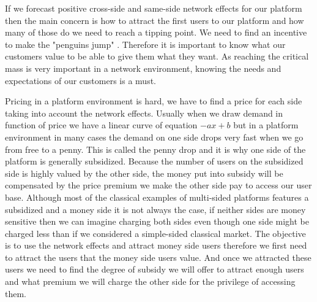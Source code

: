 \documentclass[10pt]{report}
\begin{document}
If we forecast positive cross-side and same-side network effects for our platform then the main concern is how to attract the first users to our platform and how many of those do we need to reach a tipping point. We need to find an incentive to make the "penguins jump" \autocite{coursKyle}. Therefore it is important to know what our customers value to be able to give them what they want. As reaching the critical mass is very important in a network environment, knowing the needs and expectations of our customers is a must. 

Pricing in a platform environment is hard, we have to find a price for each side taking into account the network effects. Usually when we draw demand in function of price we have a linear curve of equation $-ax + b$ but in a platform environment in many cases the demand on one side drops very fast when we go from free to a penny. This is called the penny drop and it is why one side of the platform is generally subsidized. Because the number of users on the subsidized side is highly valued by the other side, the money put into subsidy will be compensated by the price premium we make the other side pay to access our user base. Although most of the classical examples of multi-sided platforms features a subsidized and a money side it is not always the case, if neither sides are money sensitive then we can imagine charging both sides even though one side might be charged less than if we considered a simple-sided classical market.
The objective is to use the network effects and attract money side users therefore we first need to attract the users that the money side users value. And once we attracted these users we need to find the degree of subsidy we will offer to attract enough users and what premium we will charge the other side for the privilege of accessing them. \autocite{rochet2003platform}
\end{document}
